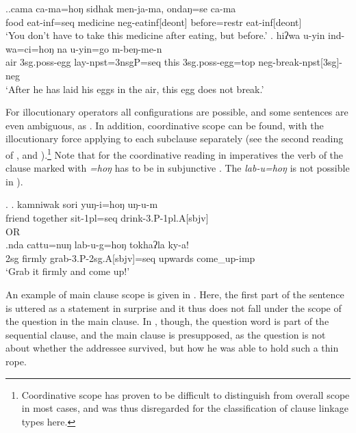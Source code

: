 \ex.\ag.\label{camahong}cama ca-ma=hoŋ sidhak men-ja-ma, ondaŋ=se ca-ma\\
			food eat{\sc -inf=seq} medicine {\sc neg-}eat{\sc inf[deont]} before={\sc restr} eat{\sc -inf[deont]}\\
			‘You don’t have to take this medicine after eating, but before.’
	\bg.	hiʔwa u-yin ind-wa=ci=hoŋ na u-yin=go m-beŋ-me-n\\
			air {\sc 3sg.poss-}egg lay-{\sc npst=3nsgP=seq} this {\sc 3sg.poss-}egg={\sc top}  {\sc neg-}break{\sc -npst[3sg]-neg}\\
			‘After he has laid his eggs in the air, this egg does not break.’ 

			
For illocutionary operators all configurations are possible, and some sentences are even ambiguous, as \Next[a]. In addition,  coordinative scope can be found, with the illocutionary force applying to each subclause separately (see the second reading of \Next[a], and \Next[b]).\footnote{Coordinative scope has proven to be difficult to distinguish from overall scope in most cases, and was thus disregarded for the classification of clause linkage types here.} Note that for the coordinative reading in imperatives the verb of the clause marked with \emph{=hoŋ} has to be in subjunctive . The \emph{lab-u=hoŋ} is not possible in \Next[b]).

\ex. \ag. kamniwak sori yuŋ-i=hoŋ uŋ-u-m\\
	friend together sit{\sc -1pl=seq} drink-3.P-1pl.A[sbjv]\\
		  OR\\
	\bg.\label{ex_hong_imp_coord}nda cattu=nuŋ lab-u-g=hoŋ tokhaʔla ky-a!\\
			{\sc 2sg} firmly grab{\sc -3.P-2sg.A[sbjv]=seq} upwards come\_up{\sc -imp}\\
			‘Grab it firmly and come up!’ 
			

An example of main clause scope is given in \Next[a]. Here, the first part of the sentence is uttered as a statement in surprise and it thus does not fall under the scope of the question in the main clause. In \Next[b], though, the question word is part of the sequential clause, and the main clause is presupposed, as the question is not about whether the addressee survived, but how he was able to hold such a thin rope.

